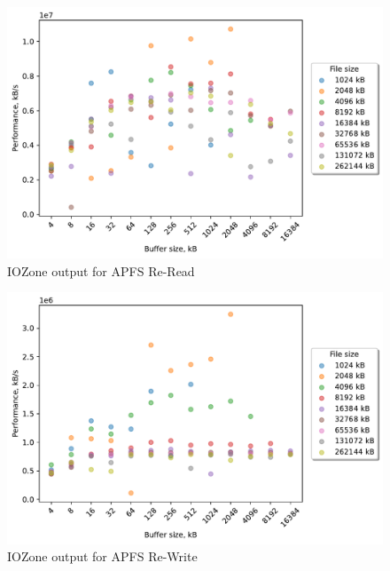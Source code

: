 \begin{figure}[!htb]
	\label{fig:bench_apfs_re_read}
	\begin{center}
		\includegraphics[width=1.0\textwidth]{figures/benchmarking/local/Re-Read.pdf}
	\end{center}
	\caption{IOZone output for \gls{APFS} \mbox{Re-Read}}
\end{figure}

\begin{figure}[!htb]
	\label{fig:bench_apfs_re_write}
	\begin{center}
		\includegraphics[width=1.0\textwidth]{figures/benchmarking/local/Re-Write.pdf}
	\end{center}
	\caption{IOZone output for \gls{APFS} \mbox{Re-Write}}
\end{figure}

